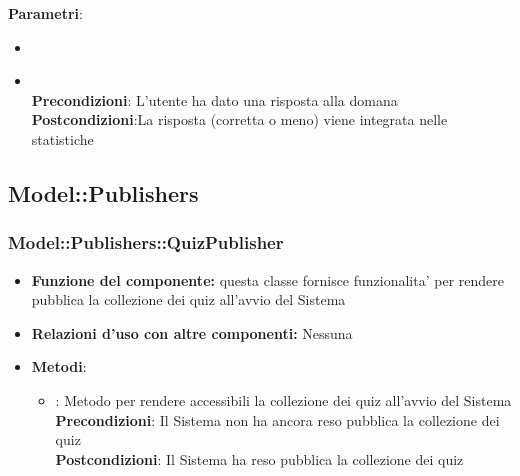 \begin{itemize}
\begin{itemize}
	\textbf{Parametri}:
	\begin{itemize}
		\item{}\\
		\item{}\\
		\textbf{Precondizioni}: L'utente ha dato una risposta alla domana\\
		\textbf{Postcondizioni}:La risposta (corretta o meno) viene integrata nelle statistiche\\
	\end{itemize}
\end{itemize}
\end{itemize}

\subsection{Model::Publishers}
\subsubsection{Model::Publishers::QuizPublisher}
\begin{itemize}
\item\textbf{Funzione del componente:} questa classe fornisce funzionalita' per rendere pubblica la collezione dei quiz all'avvio del Sistema
\item\textbf{Relazioni d'uso con altre componenti:} Nessuna \\
\item\textbf{Metodi}:
	\begin{itemize}
		\item{} : Metodo per rendere accessibili la collezione dei quiz all'avvio del Sistema\\
		\textbf{Precondizioni}: Il Sistema non ha ancora reso pubblica la collezione dei quiz\\
		\textbf{Postcondizioni}: Il Sistema ha reso pubblica la collezione dei quiz\\
	\end{itemize}
\end{itemize}


